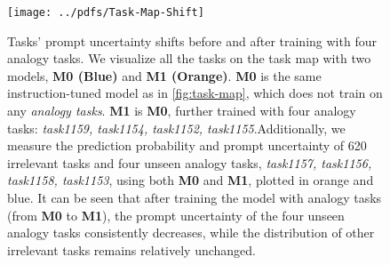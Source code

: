 \begin{figure}
    \centering
    \texttt{[image: ../pdfs/Task-Map-Shift]}
    \vspace{-2em}
    \caption{\footnotesize 
    Tasks’ prompt uncertainty shifts before and after training with four analogy tasks. We visualize all the tasks on the task map with two models, \textbf{M0 (Blue)} and \textbf{M1 (Orange)}. \textbf{M0} is the same instruction-tuned model as in \autoref{fig:task-map}, which does not train on any \textit{analogy tasks}. \textbf{M1} is \textbf{M0}, further trained with four analogy tasks: \textit{task1159, task1154, task1152, task1155}.Additionally, we measure the prediction probability and prompt uncertainty of 620 irrelevant tasks and four unseen analogy tasks, \textit{task1157, task1156, task1158, task1153}, using both \textbf{M0} and \textbf{M1}, plotted in orange and blue. It can be seen that after training the model with analogy tasks (from \textbf{M0} to \textbf{M1}), the prompt uncertainty of the four unseen analogy tasks consistently decreases, while the distribution of other irrelevant tasks remains relatively unchanged.
    }
    \vspace{-1em}
    \label{fig:task-map-shift}
\end{figure}